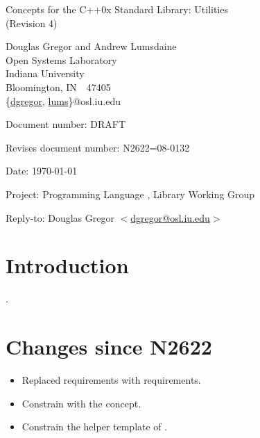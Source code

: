 \documentclass[american,twoside]{book}
\begin{document}
\raggedbottom

\begin{titlepage}
\begin{center}
\huge
Concepts for the C++0x Standard Library: Utilities\\
(Revision 4)

\vspace{0.5in}

\normalsize
Douglas Gregor and Andrew Lumsdaine \\
Open Systems Laboratory \\
Indiana University \\
Bloomington, IN\ \  47405 \\
\{\href{mailto:dgregor@osl.iu.edu}{dgregor}, \href{mailto:lums@osl.iu.edu}{lums}\}@osl.iu.edu
\end{center}

\vspace{1in}
\par\noindent Document number: DRAFT\vspace{-6pt}
\par\noindent Revises document number: N2622=08-0132\vspace{-6pt}
\par\noindent Date: \today\vspace{-6pt}
\par\noindent Project: Programming Language \Cpp{}, Library Working Group\vspace{-6pt}
\par\noindent Reply-to: Douglas Gregor $<$\href{mailto:dgregor@osl.iu.edu}{dgregor@osl.iu.edu}$>$\vspace{-6pt}

\section*{Introduction}
.

\section*{Changes since N2622}
\begin{itemize}
\item Replaced  requirements with  requirements.
\item Constrain  with the  concept.
\item Constrain the  helper template of .
\end{itemize}

\end{titlepage}
\end{document}
